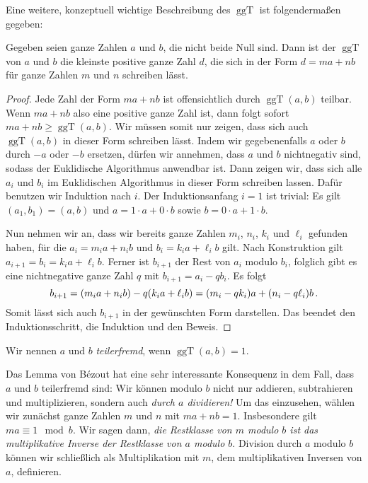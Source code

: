 Eine weitere, konzeptuell wichtige Beschreibung des $\operatorname{ggT}$ ist folgendermaßen gegeben:
\begin{satzmitnamen}
	Gegeben seien ganze Zahlen $a$ und $b$, die nicht beide Null sind. Dann ist der $\operatorname{ggT}$ von $a$ und $b$ die kleinste positive ganze Zahl $d$, die sich in der Form $d=ma+n b$ für ganze Zahlen $m$ und $n$ schreiben lässt.
\end{satzmitnamen}
\begin{proof}
	Jede Zahl der Form $ma+nb$ ist offensichtlich durch $\operatorname{ggT}(a,b)$ teilbar. Wenn $ma+nb$ also eine positive ganze Zahl ist, dann folgt sofort $ma+nb\geqslant \operatorname{ggT}(a,b)$. Wir müssen somit nur zeigen, dass sich auch $\operatorname{ggT}(a,b)$ in dieser Form schreiben lässt. Indem wir gegebenenfalls $a$ oder $b$ durch $-a$ oder $-b$ ersetzen, dürfen wir annehmen, dass $a$ und $b$ nichtnegativ sind, sodass der Euklidische Algorithmus anwendbar ist. Dann zeigen wir, dass sich alle $a_i$ und $b_i$ im Euklidischen Algorithmus in dieser Form schreiben lassen. Dafür benutzen wir Induktion nach $i$. Der Induktionsanfang $i=1$ ist trivial: Es gilt $(a_1,b_1)=(a,b)$ und $a=1\cdot a+0\cdot b$ sowie $b=0\cdot a+1\cdot b$.
	
	Nun nehmen wir an, dass wir bereits ganze Zahlen $m_i$, $n_i$, $k_i$ und $\ell_i$ gefunden haben, für die $a_i=m_i a+n_i b$ und $b_i=k_ia+\ell_ib$ gilt. Nach Konstruktion gilt $a_{i+1}=b_i=k_ia+\ell_ib$. Ferner ist $b_{i+1}$ der Rest von $a_i$ modulo $b_i$, folglich gibt es eine nichtnegative ganze Zahl $q$ mit $b_{i+1}=a_i-qb_i$. Es folgt
	\begin{equation*}
		b_{i+1}=\parens*{m_ia+n_ib}-q\parens*{k_i a+\ell_i b}=\parens*{m_i-qk_i}a+\parens*{n_i-q\ell_i}b\,.
	\end{equation*}
	Somit lässt sich auch $b_{i+1}$ in der gewünschten Form darstellen. Das beendet den Induktionsschritt, die Induktion und den Beweis.
\end{proof}

\begin{definition}
	Wir nennen $a$ und $b$ \emph{teilerfremd}, wenn $\operatorname{ggT}(a,b)=1$.
\end{definition}
Das Lemma von Bézout hat eine sehr interessante Konsequenz in dem Fall, dass $a$ und $b$ teilerfremd sind: Wir können modulo $b$ nicht nur addieren, subtrahieren und multiplizieren, sondern auch \emph{durch $a$ dividieren!} Um das einzusehen, wählen wir zunächst ganze Zahlen $m$ und $n$ mit $ma+nb=1$. Insbesondere gilt $ma\equiv 1\mod b$. Wir sagen dann, \emph{die Restklasse von $m$ modulo $b$ ist das multiplikative Inverse der Restklasse von $a$ modulo $b$}. Division durch $a$ modulo $b$ können wir schließlich als Multiplikation mit $m$, dem multiplikativen Inversen von $a$, definieren.

